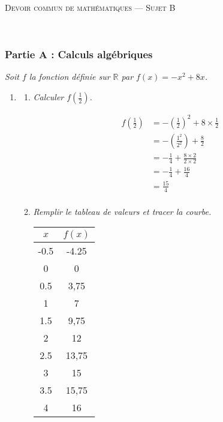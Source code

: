 \documentclass[12pt]{article}
\begin{document}
\begin{center}
  \textsc{Devoir commun de mathématiques --- Sujet B}
\end{center}

\begin{exercice}~

  \subsubsection*{Partie A : Calculs algébriques}
  \emph{Soit $f$ la fonction définie sur $\mathbb{R}$ par $f(x)=-x^2+8x$.}
  \begin{enumerate}
    \item
      \begin{multicols}{2}
      \begin{enumerate}
        \item \emph{Calculer $f\left(\frac{1}{2}\right)$.}

          \begin{align*}
            f\left(\frac{1}{2}\right) &= -\left(\frac{1}{2}\right)^2+8\times\frac{1}{2}\\
                                      &= -\left(\frac{1^2}{2^2}\right)+\frac{8}{2}\\
                                      &= -\frac{1}{4}+\frac{8\times2}{2\times2}\\
                                      &= -\frac{1}{4}+\frac{16}{4}\\
                                      &= \frac{15}{4}\\
          \end{align*}

          \columnbreak

        \item \emph{Remplir le tableau de valeurs et tracer la courbe.}
            \begin{multicols}{2}
                \begin{tabular}{|c|c|}
                  \hline
                  $x$ & $f(x)$ \\
                  \hline
                  -0.5 & -4.25 \\
                  \hline
                  0 & 0 \\
                  \hline
                  0.5 & 3,75 \\
                  \hline
                  1 & 7 \\
                  \hline
                  1.5 & 9,75 \\
                  \hline
                  2 & 12 \\
                  \hline
                  2.5 & 13,75 \\
                  \hline
                  3 & 15 \\
                  \hline
                  3.5 & 15,75 \\
                  \hline
                  4 & 16 \\
                  \hline
                \end{tabular}


\end{multicols}
\end{enumerate}
\end{multicols}
\end{enumerate}
\end{exercice}
\end{document}
